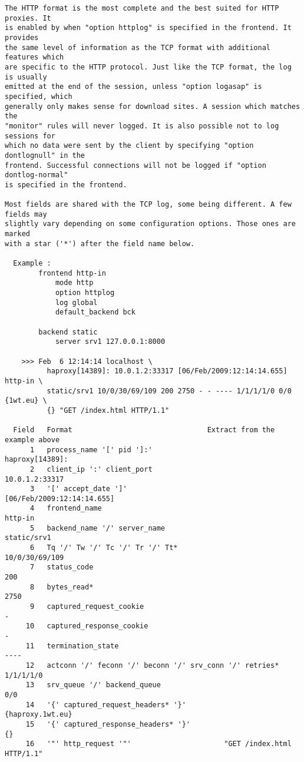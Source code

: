 \begin{verbatim}
The HTTP format is the most complete and the best suited for HTTP proxies. It
is enabled by when "option httplog" is specified in the frontend. It provides
the same level of information as the TCP format with additional features which
are specific to the HTTP protocol. Just like the TCP format, the log is usually
emitted at the end of the session, unless "option logasap" is specified, which
generally only makes sense for download sites. A session which matches the
"monitor" rules will never logged. It is also possible not to log sessions for
which no data were sent by the client by specifying "option dontlognull" in the
frontend. Successful connections will not be logged if "option dontlog-normal"
is specified in the frontend.

Most fields are shared with the TCP log, some being different. A few fields may
slightly vary depending on some configuration options. Those ones are marked
with a star ('*') after the field name below.

  Example :
        frontend http-in
            mode http
            option httplog
            log global
            default_backend bck

        backend static
            server srv1 127.0.0.1:8000

    >>> Feb  6 12:14:14 localhost \
          haproxy[14389]: 10.0.1.2:33317 [06/Feb/2009:12:14:14.655] http-in \
          static/srv1 10/0/30/69/109 200 2750 - - ---- 1/1/1/1/0 0/0 {1wt.eu} \
          {} "GET /index.html HTTP/1.1"

  Field   Format                                Extract from the example above
      1   process_name '[' pid ']:'                            haproxy[14389]:
      2   client_ip ':' client_port                             10.0.1.2:33317
      3   '[' accept_date ']'                       [06/Feb/2009:12:14:14.655]
      4   frontend_name                                                http-in
      5   backend_name '/' server_name                             static/srv1
      6   Tq '/' Tw '/' Tc '/' Tr '/' Tt*                       10/0/30/69/109
      7   status_code                                                      200
      8   bytes_read*                                                     2750
      9   captured_request_cookie                                            -
     10   captured_response_cookie                                           -
     11   termination_state                                               ----
     12   actconn '/' feconn '/' beconn '/' srv_conn '/' retries*    1/1/1/1/0
     13   srv_queue '/' backend_queue                                      0/0
     14   '{' captured_request_headers* '}'                   {haproxy.1wt.eu}
     15   '{' captured_response_headers* '}'                                {}
     16   '"' http_request '"'                      "GET /index.html HTTP/1.1"



\end{verbatim}
